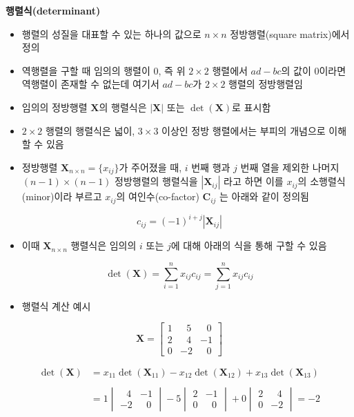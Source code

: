 \documentclass[
  11pt,
]{krantz}
\providecommand{\tightlist}{%
  \setlength{\itemsep}{0pt}\setlength{\parskip}{0pt}}
\begin{document}
\normalsize

\textbf{행렬식(determinant)}

\begin{itemize}
\tightlist
\item
  행렬의 성질을 대표할 수 있는 하나의 값으로 \(n \times n\) 정방행렬(square matrix)에서 정의
\item
  역행렬을 구할 때 임의의 행렬이 0, 즉 위 \(2\times 2\) 행렬에서 \(ad - bc\)의 값이 0이라면 역행렬이 존재할 수 없는데 여기서 \(ad - bc\)가 \(2\times 2\) 행렬의 정방행렬임
\item
  임의의 정방행렬 \(\mathrm{\mathbf X}\)의 행렬식은 \(|\mathrm{\mathbf X}|\) 또는 \(\det(\mathrm{\mathbf{X}})\)로 표시함
\item
  \(2\times 2\) 행렬의 행렬식은 넓이, \(3\times 3\) 이상인 정방 행렬에서는 부피의 개념으로 이해할 수 있음
\item
  정방행렬 \(\mathrm{\mathbf X}_{n\times n}=\{x_{ij}\}\)가 주어졌을 때, \(i\) 번째 행과 \(j\) 번째 열을 제외한 나머지 \((n-1)\times (n-1)\) 정방행렬의 행렬식을 \(|\mathrm{\mathbf{X}}_{ij}|\) 라고 하면 이를 \(x_{ij}\)의 소행렬식(minor)이라 부르고 \(x_{ij}\)의 여인수(co-factor) \(\mathrm{\mathbf{C}}_{ij}\) 는 아래와 같이 정의됨
\end{itemize}

\[
 c_{ij} = (-1)^{i+j}|\mathrm{\mathbf{X}}_{ij}|
\]

\begin{itemize}
\tightlist
\item
  이때 \(\mathrm{\mathbf X}_{n\times n}\) 행렬식은 임의의 \(i\) 또는 \(j\)에 대해 아래의 식을 통해 구할 수 있음
\end{itemize}

\[
 \det(\mathrm{\mathbf{X}}) = \sum_{i=1}^{n}x_{ij}c_{ij} = \sum_{j=1}^n x_{ij}c_{ij}
\]

\begin{itemize}
\tightlist
\item
  행렬식 계산 예시
\end{itemize}

\[\mathrm{\mathbf{X}} = 
\begin{bmatrix}
1 &~~~5 &~~~0\\
2 &~~~4 & -1\\
0 & -2  &~~~0
\end{bmatrix}
\]

\[\begin{aligned}
\det(\mathrm{\mathbf{X}}) &= x_{11}\det(\mathrm{\mathbf{X}}_{11}) - x_{12}\det(\mathrm{\mathbf{X}}_{12}) + x_{13}\det(\mathrm{\mathbf{X}}_{13}) \\
& \\
& = 1
\begin{vmatrix} 
~~~4 &  -1 \\ 
  - 2&~~~0
\end{vmatrix} -5
\begin{vmatrix}
2 &  -1 \\
0 &~~~0
\end{vmatrix} + 0
\begin{vmatrix}
2 &~~~4 \\
0 &  -2
\end{vmatrix} = -2
\end{aligned}
\]
\end{document}
